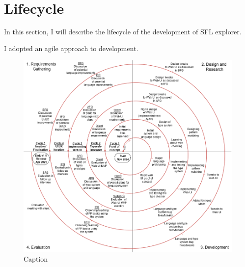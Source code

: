 \chapter{Lifecycle}
In this section, I will describe the lifecycle of the development of SFL explorer.

I adopted an agile approach to development. 


\begin{figure}
    \centering
    \includegraphics[width=\linewidth]{images/spiral2.drawio.png}
    \caption{Caption}
    \label{fig:enter-label}
\end{figure}